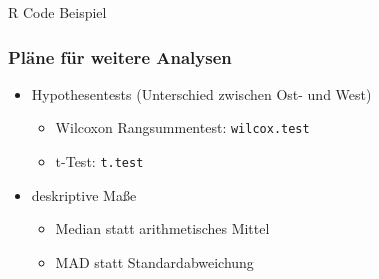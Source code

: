 \documentclass[10pt, aspectratio=169]{beamer}
\begin{document}
\begin{frame}[fragile]{R Code Beispiel}
    \frametitle{Pläne für weitere Analysen}
        \begin{itemize}
            \item Hypothesentests (Unterschied zwischen Ost- und West)
            \begin{itemize}
                \item Wilcoxon Rangsummentest: \texttt{wilcox.test}
                \item t-Test: \texttt{t.test}
            \end{itemize}
            \item deskriptive Maße
            \begin{itemize}
                \item Median statt arithmetisches Mittel
                \item MAD statt Standardabweichung
            \end{itemize}
        \end{itemize}

\end{frame}
\end{document}
